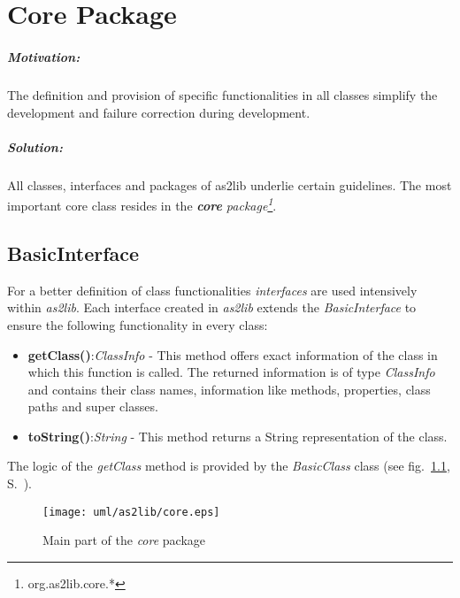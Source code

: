 
\chapter{Core Package}
\label{sec:CorePackage}

\paragraph{Motivation:}
The definition and provision of specific functionalities in all classes simplify the development and failure correction during development.

\paragraph{Solution:}
All classes, interfaces and packages of as2lib underlie certain guidelines. The most important core class resides in the \emph{\textbf{core} package\footnote{org.as2lib.core.*}}.

\section{BasicInterface}
\label{sec:BasicInterface}

For a better definition of class functionalities \emph{interfaces} are used intensively within {\sl as2lib}. Each interface created in {\sl as2lib} extends the \emph{BasicInterface} to ensure the following functionality in every class:

\begin{itemize}
	\item \textbf{getClass()}:\textit{ClassInfo} - This method offers exact information of the class in which this function is called. The returned information is of type \emph{ClassInfo} and contains their class names, information like methods, properties, class paths and super classes.
	\item \textbf{toString()}:\textit{String} - This method returns a String representation of the class.
\end{itemize}

The logic of the \emph{getClass} method is provided by the \emph{BasicClass} class
(see fig.\  \ref{fig:as2libcorepackage}, S.\ \pageref{fig:as2libcorepackage}).

\begin{figure}[!ht]
\begin{center}
\texttt{[image: uml/as2lib/core.eps]}
\caption{Main part of the \emph{core} package}
\label{fig:as2libcorepackage}
\end{center}
\end{figure}

